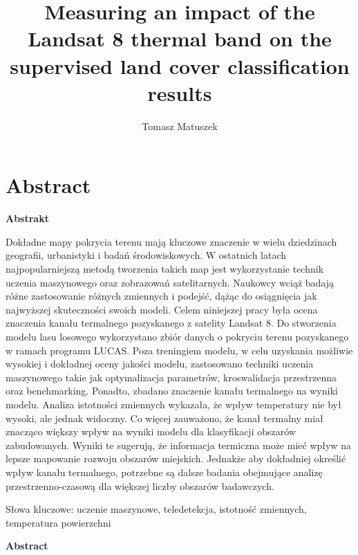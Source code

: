 \documentclass{amuthesis}
\author{Tomasz Matuszek}
\title{Measuring an impact of the Landsat 8 thermal band on the
supervised land cover classification results}
\begin{document}

\titlepage


\hypertarget{abstract}{%
\chapter*{Abstract}\label{abstract}}


\textbf{Abstrakt}

Dokładne mapy pokrycia terenu mają kluczowe znaczenie w wielu
dziedzinach geografii, urbanistyki i badań środowiskowych. W ostatnich
latach najpopularniejszą metodą tworzenia takich map jest wykorzystanie
technik uczenia maszynowego oraz zobrazowań satelitarnych. Naukowcy
wciąż badają różne zastosowanie różnych zmiennych i podejść, dążąc do
osiągnięcia jak najwyższej skuteczności swoich modeli. Celem niniejszej
pracy była ocena znaczenia kanału termalnego pozyskanego z satelity
Landsat 8. Do stworzenia modelu lasu losowego wykorzystano zbiór danych
o pokryciu terenu pozyskanego w ramach programu LUCAS. Poza treningiem
modelu, w celu uzyskania możliwie wysokiej i dokładnej oceny jakości
modelu, zastosowano techniki uczenia maszynowego takie jak optymalizacja
parametrów, kroswalidacja przestrzenna oraz benchmarking. Ponadto,
zbadano znaczenie kanału termalnego na wyniki modelu. Analiza istotności
zmiennych wykazała, że wpływ temperatury nie był wysoki, ale jednak
widoczny. Co więcej zauważono, że kanał termalny miał znacząco większy
wpływ na wyniki modelu dla klasyfikacji obszarów zabudowanych. Wyniki te
sugerują, że informacja termiczna może mieć wpływ na lepsze mapowanie
rozwoju obszarów miejskich. Jednakże aby dokładniej określić wpływ
kanału termalnego, potrzebne są dalsze badania obejmujące analizę
przestrzenno-czasową dla większej liczby obszarów badawczych.

Słowa kluczowe: uczenie maszynowe, teledetekcja, istotność zmiennych,
temperatura powierzchni

\textbf{Abstract}
\end{document}
